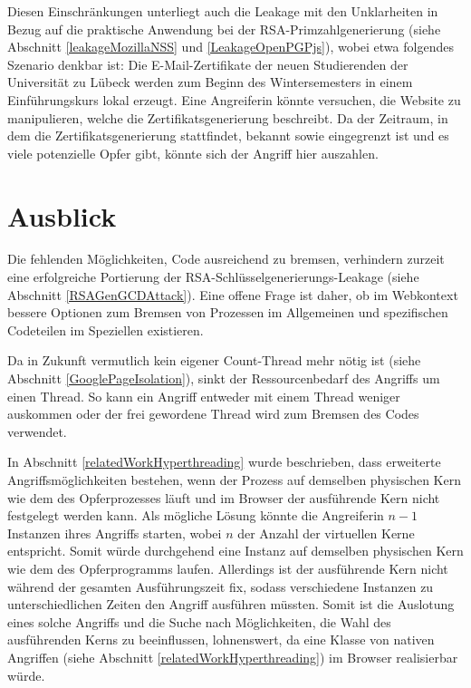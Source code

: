 Diesen Einschränkungen unterliegt auch die Leakage mit den Unklarheiten in Bezug auf die praktische Anwendung bei der RSA-Primzahlgenerierung (siehe Abschnitt \ref{leakageMozillaNSS} und \ref{LeakageOpenPGPjs}), wobei etwa folgendes Szenario denkbar ist:
Die E-Mail-Zertifikate der neuen Studierenden der Universität zu Lübeck werden zum Beginn des Wintersemesters in einem Einführungskurs lokal erzeugt. 
Eine Angreiferin könnte versuchen, die Website zu manipulieren, welche die Zertifikatsgenerierung beschreibt.
Da der Zeitraum, in dem die Zertifikatsgenerierung stattfindet, bekannt sowie eingegrenzt ist und es viele potenzielle Opfer gibt, könnte sich der Angriff hier auszahlen.


\section{Ausblick}


Die fehlenden Möglichkeiten, Code ausreichend zu bremsen, verhindern zurzeit eine erfolgreiche Portierung der RSA-Schlüsselgenerierungs-Leakage (siehe Abschnitt \ref{RSAGenGCDAttack}).
Eine offene Frage ist daher, ob im Webkontext bessere Optionen zum Bremsen von Prozessen im Allgemeinen und spezifischen Codeteilen im Speziellen existieren.

Da in Zukunft vermutlich kein eigener Count-Thread mehr nötig ist (siehe Abschnitt \ref{GooglePageIsolation}), sinkt der Ressourcenbedarf des Angriffs um einen Thread.
So kann ein Angriff entweder mit einem Thread weniger auskommen oder der frei gewordene Thread wird zum Bremsen des Codes verwendet.

In Abschnitt \ref{relatedWorkHyperthreading} wurde beschrieben, dass erweiterte Angriffsmöglichkeiten bestehen, wenn der Prozess auf demselben physischen Kern wie dem des Opferprozesses läuft und im Browser der ausführende Kern nicht festgelegt werden kann.
Als mögliche Lösung könnte die Angreiferin $n-1$ Instanzen ihres Angriffs starten, wobei $n$ der Anzahl der virtuellen Kerne entspricht. 
Somit würde durchgehend eine Instanz auf demselben physischen Kern wie dem des Opferprogramms laufen.
Allerdings ist der ausführende Kern nicht während der gesamten Ausführungszeit fix, sodass verschiedene Instanzen zu unterschiedlichen Zeiten den Angriff ausführen müssten.
Somit ist die Auslotung eines solche Angriffs und die Suche nach Möglichkeiten, die Wahl des ausführenden Kerns zu beeinflussen, lohnenswert, da eine Klasse von nativen Angriffen (siehe Abschnitt \ref{relatedWorkHyperthreading}) im Browser realisierbar würde.


